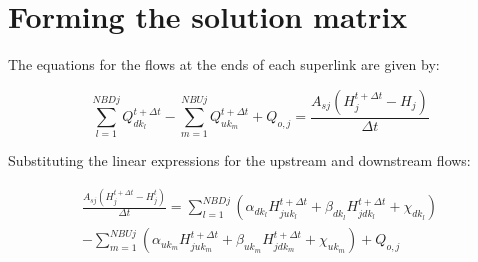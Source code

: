 \documentclass[11pt]{article}
\begin{document}






\section{Forming the solution matrix}

The equations for the flows at the ends of each superlink are given by:

\begin{equation}
  \sum_{l=1}^{NBDj} Q_{dk_l}^{t + \Delta t} - \sum_{m=1}^{NBUj} Q_{uk_m}^{t + \Delta t} + Q_{o,j} = \frac{A_{sj} (H_j^{t + \Delta t} - H_j)}{\Delta t}
\end{equation}

Substituting the linear expressions for the upstream and downstream flows:

\begin{equation}
  \begin{split}
    \frac{A_{sj} (H_j^{t + \Delta t} - H_j^t)}{\Delta t} =
    \sum_{l=1}^{NBDj} (\alpha_{dk_l} H_{juk_l}^{t + \Delta t} + \beta_{dk_l}
    H_{jdk_l}^{t + \Delta t} + \chi_{dk_l}) \\
    - \sum_{m=1}^{NBUj} (\alpha_{uk_m}
    H_{juk_m}^{t + \Delta t} + \beta_{uk_m} H_{jdk_m}^{t + \Delta t} + \chi_{uk_m}) +
    Q_{o,j}
  \end{split}
\end{equation}
\end{document}
